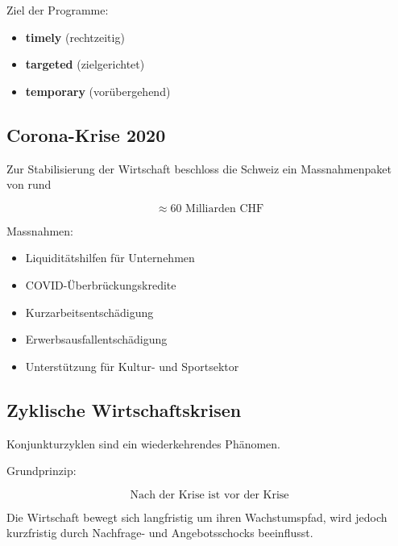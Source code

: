 Ziel der Programme:

\begin{itemize}
\item \textbf{timely} (rechtzeitig)
\item \textbf{targeted} (zielgerichtet)
\item \textbf{temporary} (vorübergehend)
\end{itemize}


\subsection{Corona-Krise 2020}

Zur Stabilisierung der Wirtschaft beschloss die Schweiz ein 
Massnahmenpaket von rund

\[
\approx 60 \text{ Milliarden CHF}
\]

Massnahmen:

\begin{itemize}
\item Liquiditätshilfen für Unternehmen
\item COVID-Überbrückungskredite
\item Kurzarbeitsentschädigung
\item Erwerbsausfallentschädigung
\item Unterstützung für Kultur- und Sportsektor
\end{itemize}


\subsection{Zyklische Wirtschaftskrisen}

Konjunkturzyklen sind ein wiederkehrendes Phänomen.

Grundprinzip:

\[
\text{Nach der Krise ist vor der Krise}
\]

Die Wirtschaft bewegt sich langfristig um ihren Wachstumspfad, 
wird jedoch kurzfristig durch Nachfrage- und Angebotsschocks beeinflusst.